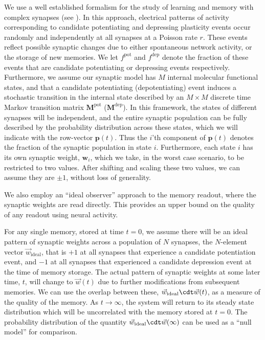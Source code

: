 \documentclass{article} %
\newcommand{\wv}{\vec{w}}
\newcommand{\wvi}{\vec{w}_\text{ideal}}
\newcommand{\pr}{\mathbf{p}}
\newcommand{\w}{\mathbf{w}}
\newcommand{\M}{\mathbf{M}}
\newcommand{\pot}{^{\text{pot}}}
\newcommand{\dep}{^{\text{dep}}}
\begin{document}
We use a well established formalism for the study of learning and memory with complex synapses (see \cite{Fusi2005cascade,Fusi2007multistate,Barrett2008discrete}).
In this approach, electrical patterns of activity corresponding to candidate potentiating and depressing plasticity events occur randomly and independently at all synapses at a Poisson rate $r$.  These events reflect possible synaptic changes due to either spontaneous network activity, or the storage of new memories.
We let  $f\pot$ and  $f\dep$ denote the fraction of these events that are candidate potentiating or depressing events respectively.
Furthermore, we assume our synaptic model has $M$ internal molecular functional states, and that a candidate potentiating (depotentiating) event induces a stochastic transition in the internal state described by an $M \times M$ discrete time Markov transition matrix  $\M\pot$ ($\M\dep$).
In this framework, the states of different synapses will be independent, and the entire synaptic population can be fully described by the probability distribution across these states, which we will indicate with the row-vector $\pr(t)$.
Thus the $i$'th component of $\pr(t)$ denotes the fraction of the synaptic population in state $i$.
Furthermore, each state $i$ has its own synaptic weight, $\w_i$, which we take, in the worst case scenario, to be restricted to two values.
After shifting and scaling these two values,  we can assume they are $\pm1$, without loss of generality.

We also employ an ``ideal observer'' approach to the memory readout, where the synaptic weights are read directly.
This provides an upper bound on the quality of any readout using neural activity.

For any single memory, stored at time $t=0$, we assume there will be an ideal pattern of synaptic weights across a population of $N$ synapses, the $N$-element vector $\wvi$, that is $+1$ at all synapses that experience a candidate potentiation event, and $-1$ at all synapses that experienced a candidate depression event at the time of memory storage.
The actual pattern of synaptic weights at some later time, $t$, will change to $\wv(t)$ due to further modifications from subsequent memories.
We can use the overlap between these, $\wvi\cdt\wv(t)$, as a measure of the quality of the memory.
As $t\to\infty$, the system will return to its steady state distribution which will be uncorrelated with the memory stored at $t=0$.
The probability distribution of the quantity $\wvi\cdt\wv(\infty)$ can be used as a ``null model'' for comparison.
\end{document}
